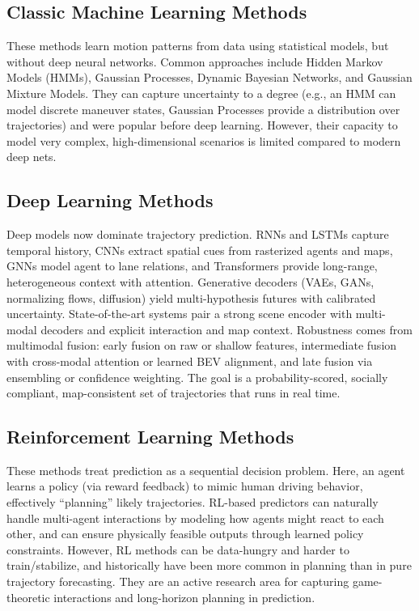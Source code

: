 \documentclass[12pt,a4paper]{report}
\begin{document}
\subsection{Classic Machine Learning Methods}
\quad These methods learn motion patterns from data using statistical models, but without deep neural networks. Common approaches include Hidden Markov Models (HMMs), Gaussian Processes, Dynamic Bayesian Networks, and Gaussian Mixture Models. They can capture uncertainty to a degree (e.g., an HMM can model discrete maneuver states, Gaussian Processes provide a distribution over trajectories) and were popular before deep learning. However, their capacity to model very complex, high-dimensional scenarios is limited compared to modern deep nets.


\subsection{Deep Learning Methods}
\quad Deep models now dominate trajectory prediction. RNNs and LSTMs capture temporal history, CNNs extract spatial cues from rasterized agents and maps, GNNs model agent to lane relations, and Transformers provide long-range, heterogeneous context with attention. Generative decoders (VAEs, GANs, normalizing flows, diffusion) yield multi-hypothesis futures with calibrated uncertainty. State-of-the-art systems pair a strong scene encoder with multi-modal decoders and explicit interaction and map context. Robustness comes from multimodal fusion: early fusion on raw or shallow features, intermediate fusion with cross-modal attention or learned BEV alignment, and late fusion via ensembling or confidence weighting. The goal is a probability-scored, socially compliant, map-consistent set of trajectories that runs in real time.

\subsection{Reinforcement Learning Methods}
\quad These methods treat prediction as a sequential decision problem. Here, an agent learns a policy (via reward feedback) to mimic human driving behavior, effectively “planning” likely trajectories. RL-based predictors can naturally handle multi-agent interactions by modeling how agents might react to each other, and can ensure physically feasible outputs through learned policy constraints. However, RL methods can be data-hungry and harder to train/stabilize, and historically have been more common in planning than in pure trajectory forecasting. They are an active research area for capturing game-theoretic interactions and long-horizon planning in prediction.
\end{document}
